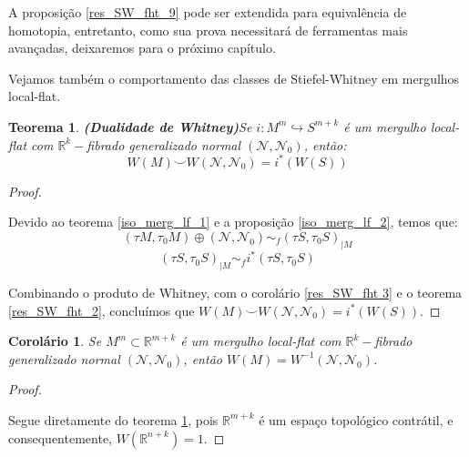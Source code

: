 \documentclass[12pt,oneside]{book} %
\newtheorem{teo}    {\hspace{0.5cm}Teorema}[chapter]
\newtheorem{cor}    {\hspace{0.5cm}Corol\'ario}[chapter]
\newcommand{\R}{\mathbb{R}}
\newcommand{\ccup}{\smile}
\begin{document}
\par A proposição \ref{res_SW_fht_9} pode ser extendida para equivalência de homotopia, entretanto, como sua prova necessitará de ferramentas mais avançadas, deixaremos para o próximo capítulo.

\par Vejamos também o comportamento das classes de Stiefel-Whitney em mergulhos local-flat.

\begin{teo}{\bf (Dualidade de Whitney)}\label{res_SW_fht_10}
	Se $i:M^{m}\hookrightarrow S^{m+k}$ é um mergulho local-flat com $\R^{k}-$fibrado generalizado normal $(\mathcal{N},\mathcal{N}_{0})$, então:
	$$ W(M)\ccup W(\mathcal{N},\mathcal{N}_{0})=i^{*}(W(S)) $$
\end{teo}
\begin{proof}
	
	\
	
	\par Devido ao teorema \ref{iso_merg_lf_1} e a proposição \ref{iso_merg_lf_2}, temos que:	
	$$ (\tau M,\tau_{0}M)\oplus (\mathcal{N},\mathcal{N}_{0})\sim_{f} (\tau S,\tau_{0}S)_{|M} $$	
	$$ (\tau S,\tau_{0}S)_{|M}\sim_{f} i^{*}(\tau S,\tau_{0}S) $$
	
	\par Combinando o produto de Whitney, com o corolário \ref{res_SW_fht 3} e o teorema \ref{res_SW_fht_2}, concluímos que $W(M)\ccup W(\mathcal{N},\mathcal{N}_{0})=i^{*}(W(S))$.
	
\end{proof}

\begin{cor}\label{res_SW_fht_11}
	Se $M^{m}\subset \R^{m+k}$ é um mergulho local-flat com $\R^{k}-$fibrado generalizado normal $(\mathcal{N},\mathcal{N}_{0})$, então $W(M)=W^{-1}(\mathcal{N},\mathcal{N}_{0})$.
\end{cor}
\begin{proof}
	
	\
	
	\par Segue diretamente do teorema \ref{res_SW_fht_10}, pois $\R^{m+k}$ é um espaço topológico contrátil, e consequentemente, $W(\R^{n+k})=1$.
	
\end{proof}



\end{document}
